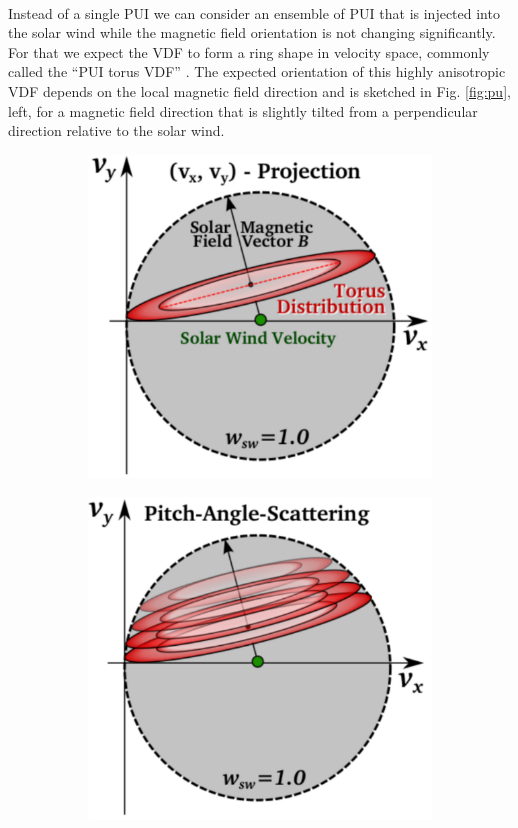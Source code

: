 \\
Instead of a single PUI we can consider an ensemble of PUI that is injected into the solar wind while the magnetic field orientation is not changing significantly. For that we expect the VDF to form a ring shape in velocity space, commonly called the ``PUI torus VDF'' \citep{oka_2002}. The expected orientation of this highly anisotropic VDF depends on the local magnetic field direction and is sketched in Fig. \ref{fig:pu}, left, for a magnetic field direction that is slightly tilted from a perpendicular direction relative to the solar wind.
\begin{figure}
	\centering
	\begin{subfigure}{.32\textwidth}
		\centering
		\includegraphics[width=1.\linewidth]{Figures/torus.pdf}
	\end{subfigure}%
	\begin{subfigure}{.32\textwidth}
		\centering
		\includegraphics[width=1.\linewidth]{Figures/PAS.pdf}

\end{subfigure}
\end{figure}
